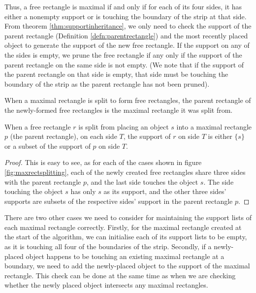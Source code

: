 \documentclass{article}
\begin{document}
Thus, a free rectangle is maximal if and only if for each of its four sides, it has either a nonempty support or is touching the boundary of the strip at that side. From theorem \ref{thm:supportinheritance}, we only need to check the support of the parent rectangle (Definition \ref{defn:parentrectangle}) and the most recently placed object to generate the support of the new free rectangle. If the support on any of the sides is empty, we prune the free rectangle if any only if the support of the parent rectangle on the same side is not empty. (We note that if the support of the parent rectangle on that side is empty, that side must be touching the boundary of the strip as the parent rectangle has not been pruned).

\begin{defn}
\label{defn:parentrectangle}
When a maximal rectangle is split to form free rectangles, the parent rectangle of the newly-formed free rectangles is the maximal rectangle it was split from.
\end{defn}

\begin{thm}
\label{thm:supportinheritance}
When a free rectangle $r$ is split from placing an object $s$ into a maximal rectangle $p$ (the parent rectangle), on each side $T$, the support of $r$ on side $T$ is either $\{s\}$ or a subset of the support of $p$ on side $T$.
\end{thm}
\begin{proof}
This is easy to see, as for each of the cases shown in figure \ref{fig:maxrectsplitting}, each of the newly created free rectangles share three sides with the parent rectangle $p$, and the last side touches the object $s$. The side touching the object $s$ has only $s$ as its support, and the other three sides' supports are subsets of the respective sides' support in the parent rectangle $p$.
\end{proof}

There are two other cases we need to consider for maintaining the support lists of each maximal rectangle correctly. Firstly, for the maximal rectangle created at the start of the algorithm, we can initialise each of its support lists to be empty, as it is touching all four of the boundaries of the strip. Secondly, if a newly-placed object happens to be touching an existing maximal rectangle at a boundary, we need to add the newly-placed object to the support of the maximal rectangle. This check can be done at the same time as when we are checking whether the newly placed object intersects any maximal rectangles.\\
\end{document}
